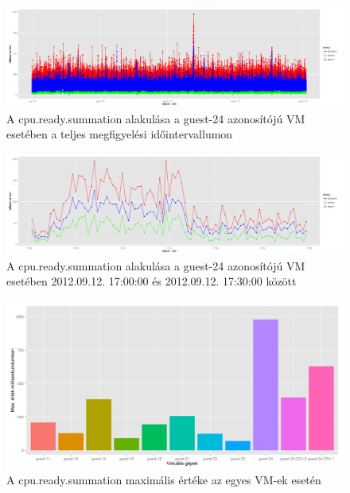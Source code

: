 \documentclass[a4paper,10pt,titlepage]{article}
\begin{document}
\begin{figure}[h!]
\centering
\includegraphics[width=1.00\textwidth]{figures/cpu_ready_summation-guest-24-20120826230140-20120924083120.png}
\caption{A cpu.ready.summation alakulása a guest-24 azonosítójú VM esetében a teljes megfigyelési időintervallumon \label{fig:cpu_ready_summation_g24_1}}
\end{figure}

\begin{figure}[h!]
\centering
\includegraphics[width=1.00\textwidth]{figures/cpu_ready_summation-guest-24-20120912170000-20120912173000.png}
\caption{A cpu.ready.summation alakulása a guest-24 azonosítójú VM esetében 2012.09.12. 17:00:00 és 2012.09.12. 17:30:00 között \label{fig:cpu_ready_summation_g24_1}}
\end{figure}



\begin{figure}[h!]
\centering
\includegraphics[width=1.00\textwidth]{figures/cpu_ready_summation-max-barchart.png}
\caption{A cpu.ready.summation maximális értéke az egyes VM-ek esetén \label{fig:cpu_ready_summation_max_barchart}}
\end{figure}
\end{document}
